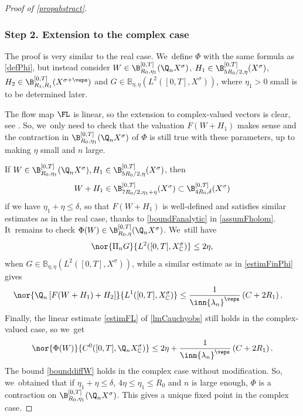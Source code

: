 \begin{proof}[Proof of \cref{propabstract}]
\subsubsection*{Step 2. Extension to the complex case} The proof is very similar to the real case. We~define $\Phi$ with the same formula as \eqref{defPhi}, but instead consider $W\in \B_{R_{0},\eta_{1}}^{[0,T]}(\Q_n X^{\sigma})$, $H_{1}\in \B_{5R_{0}/2,\eta}^{[0,T]}(X^{\sigma})$, $H_{2}\in \B_{R_{1}, R_{1}}^{[0,T]}(X^{\sigma+\veps})$ and $G\in \mathbb{B}_{\eta,\eta}(L^{2}([0,T],X^{\sigma}))$, where $\eta_{1}>0$ small is to be determined later.

The flow map $\FL$ is linear, so the extension to complex-valued vectors is clear, see \cite[Th.\,3]{BS:71-polynomials}. So, we~only need to check that the valuation $F(W+H_{1})$ makes sense and the contraction in $\B_{R_{0},\eta_{1}}^{[0,T]}(\Q_n X^{\sigma})$ of $\Phi$ is still true with these parameters, up to making $\eta$ small and $n$ large.

If $W\in \B_{R_{0},\eta_{1}}^{[0,T]}(\Q_n X^{\sigma}), H_{1}\in \B_{5R_{0}/2,\eta}^{[0,T]}(X^{\sigma})$, then
\[
W+H_{1}\in \B_{7R_{0}/2,\eta_{1}+\eta}^{[0,T]}(X^{\sigma})\subset \B_{4R_{0},\delta}^{[0,T]}(X^{\sigma})
\]
if we have $\eta_{1}+\eta\leq \delta$, so that $F(W+H_{1})$ is well-defined and satisfies similar estimates as in the real case, thanks to \eqref{boundFanalytic} in \cref{assumFholom}. It~remains to check $\Phi(W)\in \B_{R_{0},\eta}^{[0,T]}(\Q_n X^{\sigma})$. We~still have
\begin{align*}
\nor{\Pi_{n}G}{L^{2}([0,T],X_\mathbb{C}^{\sigma})}\leq 2\eta,
\end{align*}
when $G\in \mathbb{B}_{\eta,\eta}(L^{2}([0,T],X^{\sigma}))$, while a similar estimate as in \eqref{estimFinPhi} gives
\begin{align*}
\nor{\Q_{n}\left[ F(W+H_{1})+H_{2}\right]}{L^{1}([0,T],X_\mathbb{C}^{\sigma})}&\leq \frac{1}{\inn{\lambda_n}^{\veps}} \left(C+2R_{1}\right).
\end{align*}
Finally, the linear estimate \eqref{estimFL} of \cref{lmCauchyobs} still holds in the complex-valued case, so we~get
\begin{align*}
\nor{\Phi(W)}{C^{0}([0,T],\Q_{n}X_\mathbb{C}^{\sigma})}\leq 2\eta+ \frac{1}{\inn{\lambda_n}^{\veps}} \left(C+2R_{1}\right).
\end{align*}
The bound \eqref{bounddiffW} holds in the complex case without modification. So, we~obtained that if $\eta_{1}+\eta\leq \delta$, $4\eta\leq \eta_{1}\leq R_{0}$ and $n$ is large enough, $\Phi$ is a contraction on $\B_{R_{0},\eta_{1}}^{[0,T]}(\Q_n X^{\sigma})$. This gives a unique fixed point in the complex case.


\end{proof}

